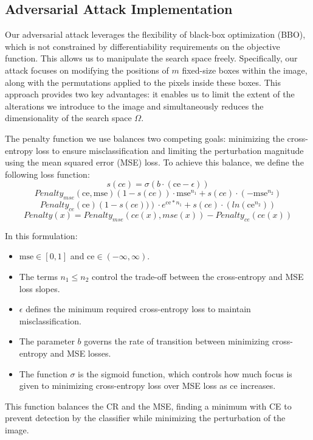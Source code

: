 \subsection{Adversarial Attack Implementation}
\label{advarserial_atack_implementation}
Our adversarial attack leverages the flexibility of black-box optimization (BBO), which is not constrained by differentiability requirements on the objective function. This allows us to manipulate the search space freely. Specifically, our attack focuses on modifying the positions of $m$ fixed-size boxes within the image, along with the permutations applied to the pixels inside these boxes. This approach provides two key advantages: it enables us to limit the extent of the alterations we introduce to the image and simultaneously reduces the dimensionality of the search space $\Omega$.

The penalty function we use balances two competing goals: minimizing the cross-entropy loss to ensure misclassification and limiting the perturbation magnitude using the mean squared error (MSE) loss. To achieve this balance, we define the following loss function:
\[
s(ce) = \sigma\left(b \cdot (\text{ce} - \epsilon)\right)
\]
\[
    Penalty_{mse}(\text{ce}, \text{mse}) \left(1 - s(ce)\right) \cdot \text{mse}^{n_1} + s(ce) \cdot \left( -\text{mse}^{n_2} \right)
\]
\[
    Penalty_{ce}(\text{ce}) \left(1 - s(ce))\right) \cdot e^{\text{ce} * n_1} + s(ce) \cdot \left( ln(\text{ce}^{n_2}) \right)
\]
\[
Penalty(x) = Penalty_{mse}(ce(x), mse(x)) - Penalty_{ce}(ce(x))
\]

In this formulation:
\begin{itemize}
    \item $\text{mse} \in [0, 1]$ and $\text{ce} \in (-\infty, \infty)$.
    \item The terms $n_1 \leq n_2$ control the trade-off between the cross-entropy and MSE loss slopes.
    \item $\epsilon$ defines the minimum required cross-entropy loss to maintain misclassification.
    \item The parameter $b$ governs the rate of transition between minimizing cross-entropy and MSE losses.
    \item The function $\sigma$ is the sigmoid function, which controls how much focus is given to minimizing cross-entropy loss over MSE loss as $\text{ce}$ increases.
\end{itemize}

This function balances the CR and the MSE, finding a minimum with CE to prevent detection by the classifier while minimizing the perturbation of the image.



